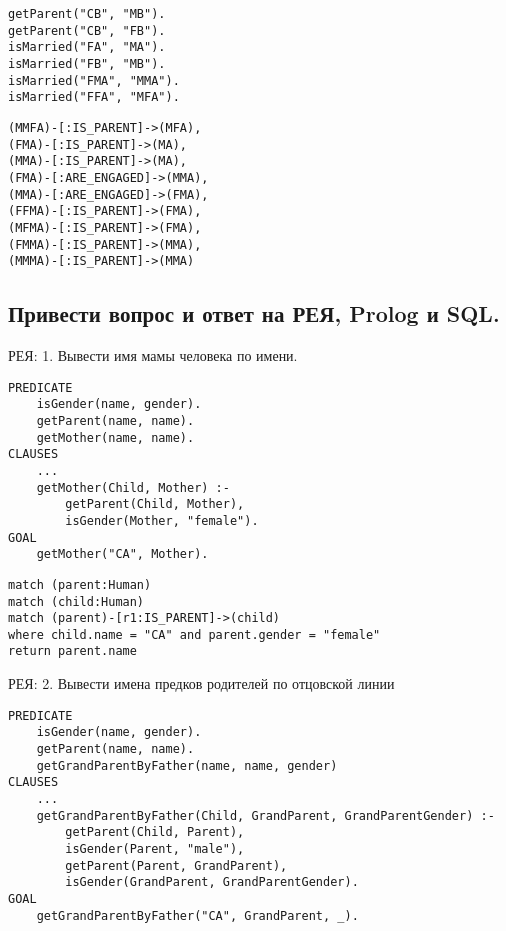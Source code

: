 \noindent\begin{minipage}[T]{.45\textwidth}
\begin{lstlisting}[caption=Prolog (Продолжение)]
getParent("CB", "MB").	
getParent("CB", "FB").
isMarried("FA", "MA").
isMarried("FB", "MB").	
isMarried("FMA", "MMA").
isMarried("FFA", "MFA").			
\end{lstlisting}
\end{minipage}\hfill
\begin{minipage}[T]{.5\textwidth}
	\begin{lstlisting}[caption=Neo4j (Продолжение)]
(MMFA)-[:IS_PARENT]->(MFA),
(FMA)-[:IS_PARENT]->(MA),
(MMA)-[:IS_PARENT]->(MA),
(FMA)-[:ARE_ENGAGED]->(MMA),
(MMA)-[:ARE_ENGAGED]->(FMA),
(FFMA)-[:IS_PARENT]->(FMA),
(MFMA)-[:IS_PARENT]->(FMA),
(FMMA)-[:IS_PARENT]->(MMA),
(MMMA)-[:IS_PARENT]->(MMA)	
	\end{lstlisting}
\end{minipage}

\subsection*{Привести вопрос и ответ на РЕЯ, Prolog и SQL.}

РЕЯ: 1. Вывести имя мамы человека по имени.

\begin{lstlisting}[caption=Prolog: Вывести имя мамы человека по имени]
PREDICATE
	isGender(name, gender).
	getParent(name, name).
	getMother(name, name).
CLAUSES
	...
	getMother(Child, Mother) :-
		getParent(Child, Mother),
		isGender(Mother, "female").
GOAL
	getMother("CA", Mother).	
\end{lstlisting}

\begin{lstlisting}[caption=Neo4j: Вывести имя мамы человека по имени]
match (parent:Human) 
match (child:Human) 
match (parent)-[r1:IS_PARENT]->(child) 
where child.name = "CA" and parent.gender = "female"    
return parent.name
\end{lstlisting}

\clearpage

РЕЯ: 2. Вывести имена предков родителей по отцовской линии

\begin{lstlisting}[caption=Prolog:  Вывести имена предков родителей по отцовской линии]
PREDICATE
	isGender(name, gender).
	getParent(name, name).
	getGrandParentByFather(name, name, gender)
CLAUSES
	...
	getGrandParentByFather(Child, GrandParent, GrandParentGender) :- 
		getParent(Child, Parent),
		isGender(Parent, "male"),
		getParent(Parent, GrandParent),
		isGender(GrandParent, GrandParentGender).
GOAL
	getGrandParentByFather("CA", GrandParent, _).	
\end{lstlisting}

